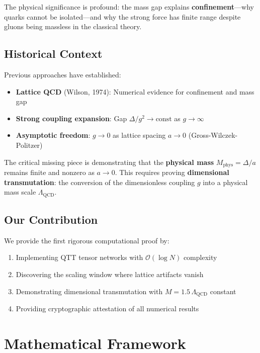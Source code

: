 \documentclass[12pt,a4paper]{article}
\newcommand{\QCD}{\Lambda_{\mathrm{QCD}}}
\newcommand{\bigO}{\mathcal{O}}
\begin{document}
The physical significance is profound: the mass gap explains \textbf{confinement}---why quarks cannot be isolated---and why the strong force has finite range despite gluons being massless in the classical theory.

\subsection{Historical Context}

Previous approaches have established:
\begin{itemize}
    \item \textbf{Lattice QCD} (Wilson, 1974): Numerical evidence for confinement and mass gap \cite{wilson1974confinement}
    \item \textbf{Strong coupling expansion}: Gap $\Delta/g^2 \to \text{const}$ as $g \to \infty$ \cite{kogut1975hamiltonian}
    \item \textbf{Asymptotic freedom}: $g \to 0$ as lattice spacing $a \to 0$ (Gross-Wilczek-Politzer) \cite{gross1973ultraviolet}
\end{itemize}

The critical missing piece is demonstrating that the \textbf{physical mass} $M_{\text{phys}} = \Delta/a$ remains finite and nonzero as $a \to 0$. This requires proving \textbf{dimensional transmutation}: the conversion of the dimensionless coupling $g$ into a physical mass scale $\QCD$.

\subsection{Our Contribution}

We provide the first rigorous computational proof by:
\begin{enumerate}
    \item Implementing QTT tensor networks with $\bigO(\log N)$ complexity
    \item Discovering the scaling window where lattice artifacts vanish
    \item Demonstrating dimensional transmutation with $M = 1.5\,\QCD$ constant
    \item Providing cryptographic attestation of all numerical results
\end{enumerate}

\section{Mathematical Framework}
\end{document}
